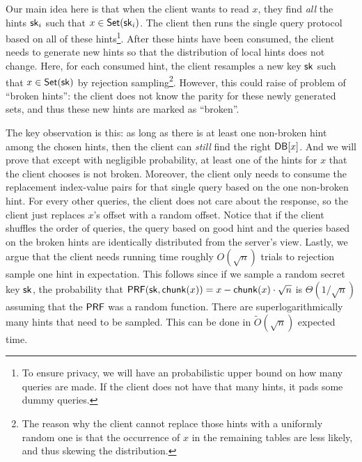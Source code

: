 Our main idea here is that when the client wants to read $x$, they find
\emph{all} the hints $\mathsf{sk}_i$ such that $x\in\mathsf{Set}(\mathsf{sk}_i)$. The client then runs
the single query protocol based on all of these hints\footnote{To ensure privacy, we
will have an probabilistic upper bound on how many queries are made. If the
client does not have that many hints, it pads some dummy queries.}. After these
hints have been consumed, the client needs to generate new hints so that the
distribution of local hints does not change. Here, for each consumed hint, the
client resamples a new key $\mathsf{sk}$ such that $x\in \mathsf{Set}(\mathsf{sk})$ by rejection
sampling\footnote{The reason why the client cannot replace those hints with a
uniformly random one is that the occurrence of $x$ in the remaining tables are
less likely, and thus skewing the distribution.}. However, this could raise of
problem of ``broken hints'': the client does not know the parity for these newly
generated sets, and thus these new hints are marked as ``broken''. 

The key observation is this: as long as there is at least one non-broken hint
among the chosen hints, then the client can \emph{still} find the right
$\mathsf{DB}[x]$. And we will prove that except with negligible probability, at least
one of the hints for $x$ that the client chooses is not broken. Moreover, the
client only needs to consume the replacement index-value pairs for that single
query based on the one non-broken hint. For every other queries, the client does
not care about the response, so the client just replaces $x$'s offset with a
random offset. Notice that if the client shuffles the order of queries, the
query based on good hint and the queries based on the broken hints are
identically distributed from the server's view. Lastly, we argue that the client needs running time roughly $O(\sqrt{n})$ trials to rejection sample one hint in expectation. This follows since if we sample a random secret key
$\mathsf{sk}$, the probability that $\mathsf{PRF}(\mathsf{sk},\mathsf{chunk}(x))=x-\mathsf{chunk}(x)\cdot \sqrt{n}$ is
$\Theta(1/\sqrt{n})$ assuming that the $\mathsf{PRF}$ was a random function. There are superlogarithmically many hints that need to be sampled.
This can be done in $\widetilde{O}(\sqrt{n})$ expected
time.


